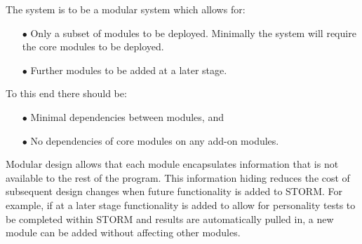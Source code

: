 \begin{flushleft}
The system is to be a modular system which allows for:
\end{flushleft}

\begin{itemize} 
\item[$\bullet$] Only a subset of modules to be deployed. Minimally the system will require the core modules to be deployed.
\item[$\bullet$] Further modules to be added at a later stage.
\end{itemize}

\begin{flushleft}
To this end there should be:
\end{flushleft}

\begin{itemize} 
\item[$\bullet$] Minimal dependencies between modules, and
\item[$\bullet$] No dependencies of core modules on any add-on modules.
\end{itemize}

\begin{flushleft}
Modular design allows that each module encapsulates information that is not available to the rest of the program. This information hiding reduces the cost of subsequent design changes when future functionality is added to STORM. For example, if at a later stage functionality is added to allow for personality tests to be completed within STORM and results are automatically pulled in, a new module can be added without affecting other modules.
\end{flushleft}